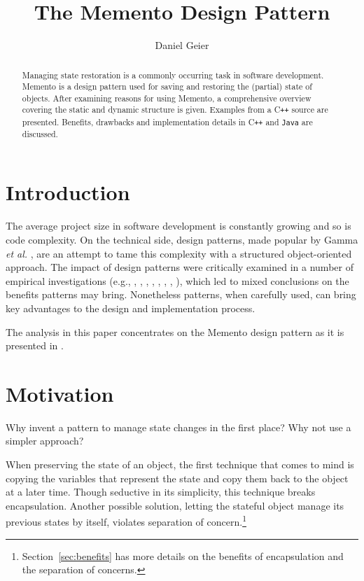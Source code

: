 \documentclass[11pt, a4paper, twoside]{article}
\title{The Memento Design Pattern}
\author{Daniel Geier}
\date{} %
\def\cpp{C{}\texttt{++}}
\begin{document}
	\maketitle

	\begin{abstract} \noindent
 		Managing state restoration is a commonly occurring task in software development. Memento is a design pattern used for saving and restoring the (partial) state of objects. After examining reasons for using Memento, a comprehensive overview covering the static and dynamic structure is given. Examples from a \cpp{} source are presented. Benefits, drawbacks and implementation details in \cpp{} and \verb|Java| are discussed.
	\end{abstract}
	
	\section{Introduction}
	\label{sec:intro}
	The average project size in software development is constantly growing and so is code complexity. On the technical side, design patterns, made popular by Gamma \textit{et al.} \cite{gamma1993design}, are an attempt to tame this complexity with a structured object-oriented approach. The impact of design patterns were critically examined in a number of empirical investigations (e.g., \cite{bieman2003design}, \cite{porras2010empirical}, \cite{jeanmart2009impact}, \cite{khomh2008design}, \cite{di2008empirical}, \cite{prechelt2001controlled}, \cite{vokac2004defect}, \cite{vokavc2004controlled}), which led to mixed conclusions on the benefits patterns may bring. Nonetheless patterns, when carefully used, can bring key advantages to the design and implementation process.
	
	The analysis in this paper concentrates on the Memento design pattern as it is presented in \cite{gamma1994design}.
	
	\section{Motivation}
	\label{sec:motivation}
	 Why invent a pattern to manage state changes in the first place? Why not use a simpler approach?
	 
	 When preserving the state of an object, the first technique that comes to mind is copying the variables that represent the state and copy them back to the object at a later time. Though seductive in its simplicity, this technique breaks encapsulation. Another possible solution, letting the stateful object manage its previous states by itself, violates separation of concern.\footnote{Section~\ref{sec:benefits} has more details on the benefits of encapsulation and the separation of concerns.}
	 
\end{document}
